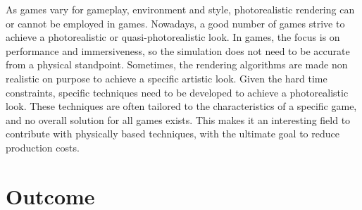 As games vary for gameplay, environment and style, photorealistic rendering can or cannot be employed in games. Nowadays, a good number of games strive to achieve a photorealistic or quasi-photorealistic look. In games, the focus is on performance and immersiveness, so the simulation does not need to be accurate from a physical standpoint. Sometimes, the rendering algorithms are made non realistic on purpose to achieve a specific artistic look. Given the hard time constraints, specific techniques need to be developed to achieve a photorealistic look. These techniques are often tailored to the characteristics of a specific game, and no overall solution for all games exists. This makes it an interesting field to contribute with physically based techniques, with the ultimate goal to reduce production costs.

\section{Outcome}
